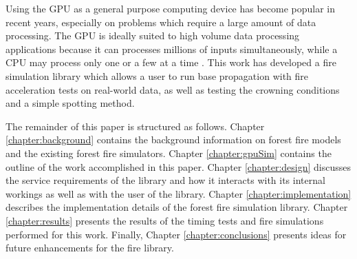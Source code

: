 
Using the GPU as a general purpose computing device has become popular in recent years, especially on problems which require a large amount of data processing. The GPU is ideally suited to high volume data processing applications because it can processes millions of inputs simultaneously, while a CPU may process only one or a few at a time \cite{cudabyexample}. This work has developed a fire simulation library which allows a user to run base propagation with fire acceleration tests on real-world data, as well as testing the crowning conditions and a simple spotting method. 

The remainder of this paper is structured as follows. Chapter \ref{chapter:background} contains the background information on forest fire models and the existing forest fire simulators. Chapter \ref{chapter:gpuSim} contains the outline of the work accomplished in this paper. Chapter \ref{chapter:design} discusses the service requirements of the library and how it interacts with its internal workings as well as with the user of the library. Chapter \ref{chapter:implementation} describes the implementation details of the forest fire simulation library. Chapter \ref{chapter:results} presents the results of the timing tests and fire simulations performed for this work. Finally, Chapter \ref{chapter:conclusions} presents ideas for future enhancements for the fire library. 
